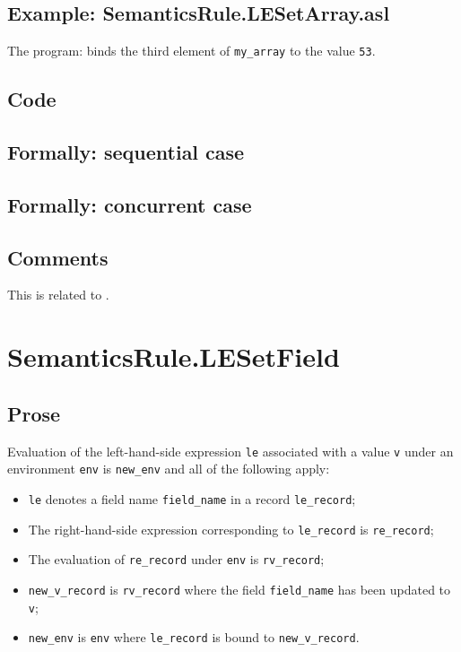 \documentclass{book}
\begin{document}
    \subsection{Example: SemanticsRule.LESetArray.asl}
    The program:
    binds the third element of \texttt{my\_array} to the value \texttt{53}.

  \subsection{Code}

\begin{emptyformal}
  \subsection{Formally: sequential case}

  \subsection{Formally: concurrent case}
\end{emptyformal}

\subsection{Comments}
  This is related to .


\section{SemanticsRule.LESetField \label{sec:SemanticsRule.LESetField}}

    \subsection{Prose}
    Evaluation of the left-hand-side expression \texttt{le} associated with a
value \texttt{v} under an environment \texttt{env} is \texttt{new\_env} and all
of the following apply:
    \begin{itemize}
    \item \texttt{le} denotes a field name \texttt{field\_name} in a record \texttt{le\_record};
    \item The right-hand-side expression corresponding to \texttt{le\_record} is
      \texttt{re\_record};
    \item The evaluation of \texttt{re\_record} under \texttt{env} is \texttt{rv\_record};
    \item \texttt{new\_v\_record} is \texttt{rv\_record} where the field \texttt{field\_name} has been
      updated to \texttt{v};
    \item \texttt{new\_env} is \texttt{env} where \texttt{le\_record} is bound to
      \texttt{new\_v\_record}.
    \end{itemize}
\end{document}
